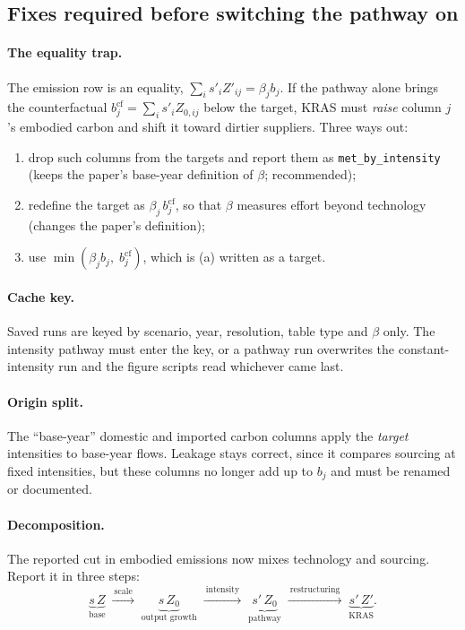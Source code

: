 \documentclass[11pt,a4paper]{article}
\newcommand{\code}[1]{\texttt{#1}}
\begin{document}
\subsection{Fixes required before switching the pathway on}

\paragraph{The equality trap.} The emission row is an equality,
$\sum_i s'_i Z'_{ij} = \beta_j b_j$. If the pathway alone brings the
counterfactual $b^{\mathrm{cf}}_j = \sum_i s'_i Z_{0,ij}$ below the target,
KRAS must \emph{raise} column $j$'s embodied carbon and shift it toward dirtier
suppliers. Three ways out:
\begin{enumerate}[label=(\alph*)]
  \item drop such columns from the targets and report them as
        \code{met\_by\_intensity} (keeps the paper's base-year definition of
        $\beta$; recommended);
  \item redefine the target as $\beta_j\, b^{\mathrm{cf}}_j$, so that $\beta$
        measures effort beyond technology (changes the paper's definition);
  \item use $\min(\beta_j b_j,\; b^{\mathrm{cf}}_j)$, which is (a) written as
        a target.
\end{enumerate}

\paragraph{Cache key.} Saved runs are keyed by scenario, year, resolution,
table type and $\beta$ only. The intensity pathway must enter the key, or a
pathway run overwrites the constant-intensity run and the figure scripts read
whichever came last.

\paragraph{Origin split.} The ``base-year'' domestic and imported carbon
columns apply the \emph{target} intensities to base-year flows. Leakage stays
correct, since it compares sourcing at fixed intensities, but these columns no
longer add up to $b_j$ and must be renamed or documented.

\paragraph{Decomposition.} The reported cut in embodied emissions now mixes
technology and sourcing. Report it in three steps:
\begin{equation}
  \underbrace{s\,Z}_{\text{base}}
  \;\xrightarrow{\ \text{scale}\ }\;
  \underbrace{s\,Z_0}_{\text{output growth}}
  \;\xrightarrow{\ \text{intensity}\ }\;
  \underbrace{s'\,Z_0}_{\text{pathway}}
  \;\xrightarrow{\ \text{restructuring}\ }\;
  \underbrace{s'\,Z'}_{\text{KRAS}} .
\end{equation}
\end{document}

